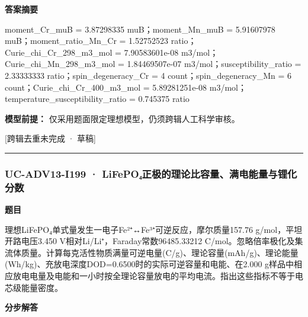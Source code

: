 \documentclass[UTF8,11pt,a4paper]{ctexart}
\begin{document}
\noindent\textbf{答案摘要}\par
moment\_Cr\_muB = 3.87298335 muB；moment\_Mn\_muB = 5.91607978 muB；moment\_ratio\_Mn\_Cr = 1.52752523 ratio；Curie\_chi\_Cr\_298\_m3\_mol = 7.90583601e-08 m3/mol；Curie\_chi\_Mn\_298\_m3\_mol = 1.84469507e-07 m3/mol；susceptibility\_ratio = 2.33333333 ratio；spin\_degeneracy\_Cr = 4 count；spin\_degeneracy\_Mn = 6 count；Curie\_chi\_Cr\_400\_m3\_mol = 5.89281251e-08 m3/mol；temperature\_susceptibility\_ratio = 0.745375 ratio\par
\noindent\textbf{模型前提：}
仅采用题面限定理想模型，仍须跨辑人工科学审核。\par
\noindent\textcolor{red!65!black}{[跨辑去重未完成 · 草稿]} \par
\medskip\hrule\medskip
{}
\subsubsection*{UC-ADV13-I199 · LiFePO₄正极的理论比容量、满电能量与锂化分数}
\noindent\textbf{题目}\par
理想LiFePO₄单式量发生一电子Fe²⁺↔Fe³⁺可逆反应，摩尔质量157.76 g/mol，平坦开路电压3.450 V相对Li/Li⁺，Faraday常数96485.33212 C/mol。忽略倍率极化及集流体质量。计算每克活性物质满量可逆电量(C/g)、理论容量(mAh/g)、理论能量(Wh/kg)、充放电深度DOD=0.6500时的实际可逆容量和电能、在2.000 g样品中相应放电电量及电能和一小时按全理论容量放电的平均电流。指出这些指标不等于电芯级能量密度。\par
\medskip\noindent\textbf{分步解答}
\end{document}

